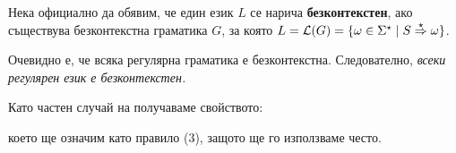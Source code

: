 

Нека официално да обявим, че един език $L$ се нарича {\bf безконтекстен}, ако съществува безконтекстна граматика $G$, за която 
$L = \L(G) = \{\omega \in \Sigma^\star \mid S \derive{\star} \omega\}$.

\begin{important}
\begin{remark}
  Очевидно е, че всяка регулярна граматика е безконтекстна. Следователно, 
  {\em всеки регулярен език е безконтекстен.}
\end{remark}
\end{important}

\begin{remark}
  Като частен случай на  получаваме свойството:
  \begin{prooftree}
  \end{prooftree}
  което ще означим като правило (3), защото ще го използваме често.
\end{remark}

